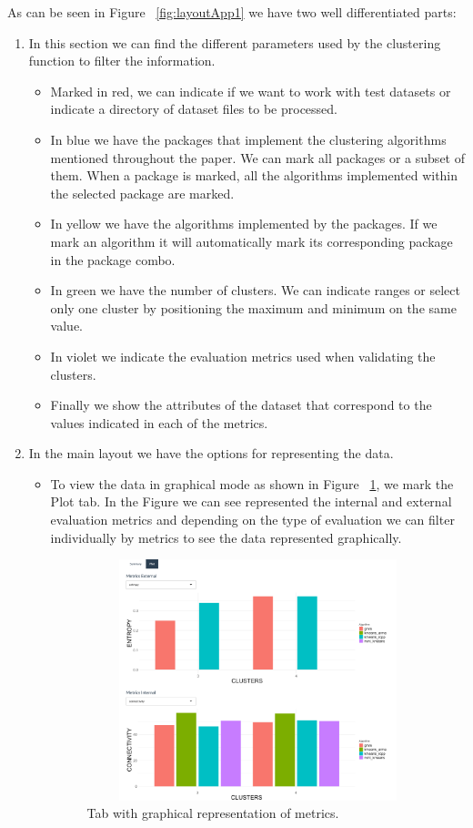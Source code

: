 As can be seen in Figure ~\ref{fig:layoutApp1} we have two well differentiated parts:
\begin{enumerate}
  \item In this section we can find the different parameters used by the clustering function to filter the information.
  \begin{itemize}
  \item Marked in red, we can indicate if we want to work with test datasets or indicate a directory of dataset files to be processed.
  \item In blue we have the packages that implement the clustering algorithms mentioned throughout the paper. We can mark all packages or a subset of them. When a package is marked, all the algorithms implemented within the selected package are marked.
  \item In yellow we have the algorithms implemented by the packages. If we mark an algorithm it will automatically mark its corresponding package in the package combo.
  \item In green we have the number of clusters. We can indicate ranges or select only one cluster by positioning the maximum and minimum on the same value.
  \item In violet we indicate the evaluation metrics used when validating the clusters.
  \item Finally we show the attributes of the dataset that correspond to the values indicated in each of the metrics.
\end{itemize}
  \item In the main layout we have the options for representing the data.
  \begin{itemize}

    \item To view the data in graphical mode as shown in Figure ~\ref{fig:tab_graph}, we mark the Plot tab. In the Figure we can see represented the internal and external evaluation metrics and depending on the type of evaluation we can filter individually by metrics to see the data represented graphically.


  \begin{figure}[htbp]
    \centering
     \includegraphics[width=12cm, height=7cm]{img/tab_graph}
      \caption{Tab with graphical representation of metrics.}
      \label{fig:tab_graph}
  \end{figure}


\end{itemize}
\end{enumerate}
